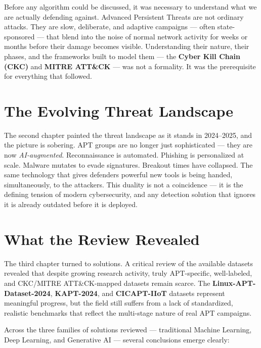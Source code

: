 ﻿\documentclass[11pt,a4paper]{report}
\begin{document}
Before any algorithm could be discussed, it was necessary to understand what
we are actually defending against. Advanced Persistent Threats are not
ordinary attacks. They are slow, deliberate, and adaptive campaigns --- often
state-sponsored --- that blend into the noise of normal network activity for
weeks or months before their damage becomes visible. Understanding their
nature, their phases, and the frameworks built to model them --- the
\textbf{Cyber Kill Chain (CKC)} and \textbf{MITRE ATT\&CK} --- was not a
formality. It was the prerequisite for everything that followed.

\section*{The Evolving Threat Landscape}

The second chapter painted the threat landscape as it stands in 2024--2025,
and the picture is sobering. APT groups are no longer just sophisticated ---
they are now \textit{AI-augmented}. Reconnaissance is automated. Phishing is
personalized at scale. Malware mutates to evade signatures. Breakout times
have collapsed. The same technology that gives defenders powerful new tools is
being handed, simultaneously, to the attackers. This duality is not a
coincidence --- it is the defining tension of modern cybersecurity, and any
detection solution that ignores it is already outdated before it is deployed.

\section*{What the Review Revealed}

The third chapter turned to solutions. A critical review of the available
datasets revealed that despite growing research activity, truly APT-specific,
well-labeled, and CKC/MITRE ATT\&CK-mapped datasets remain scarce. The
\textbf{Linux-APT-Dataset-2024}, \textbf{KAPT-2024}, and
\textbf{CICAPT-IIoT} datasets represent meaningful progress, but the field
still suffers from a lack of standardized, realistic benchmarks that reflect
the multi-stage nature of real APT campaigns.

Across the three families of solutions reviewed --- traditional Machine
Learning, Deep Learning, and Generative AI --- several conclusions emerge
clearly:
\end{document}
